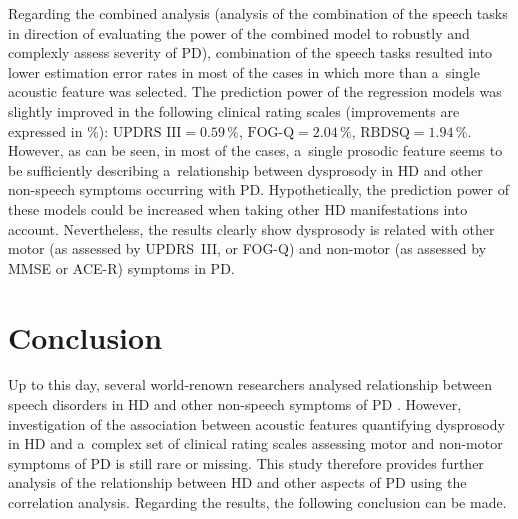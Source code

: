 Regarding the combined analysis (analysis of the combination of the speech tasks in direction of evaluating the power of the combined model to robustly and complexly assess severity of PD), combination of the speech tasks resulted into lower estimation error rates in most of the cases in which more than a~single acoustic feature was selected. The prediction power of the regression models was slightly improved in the following clinical rating scales (improvements are expressed in \%): $\mbox{UPDRS~III}=0.59\,\%$, $\mbox{FOG-Q}=2.04\,\%$, $\mbox{RBDSQ}=1.94\,\%$. However, as can be seen, in most of the cases, a~single prosodic feature seems to be sufficiently describing a~relationship between dysprosody in HD and other non-speech symptoms occurring with PD. Hypothetically, the prediction power of these models could be increased when taking other HD manifestations into account. Nevertheless, the results clearly show dysprosody is related with other motor (as assessed by UPDRS~III, or FOG-Q) and non-motor (as assessed by MMSE or ACE-R) symptoms in PD.

\section{Conclusion}
\label{ch5_5}

Up to this day, several world-renown researchers analysed relationship between speech disorders in HD and other non-speech symptoms of PD \cite{Goberman2005b, Moreau2007, Skodda2009, Skodda2011c, Skodda2013}. However, investigation of the association between acoustic features quantifying dysprosody in HD and a~complex set of clinical rating scales assessing motor and non-motor symptoms of PD is still rare or missing. This study therefore provides further analysis of the relationship between HD and other aspects of PD using the correlation analysis. Regarding the results, the following conclusion can be made.

